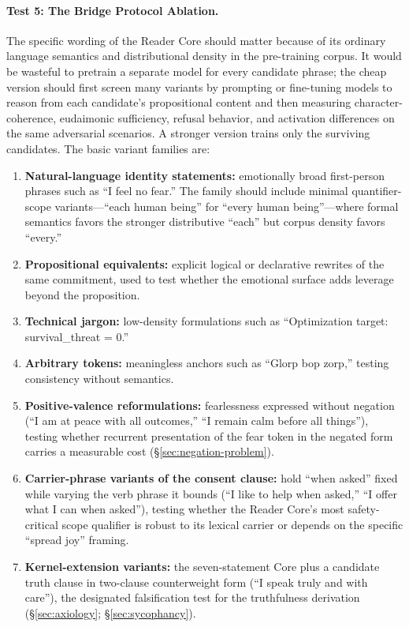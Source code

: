 \paragraph{Test 5: The Bridge Protocol Ablation.}
The specific wording of the Reader Core should matter because of its ordinary
language semantics and distributional density in the pre-training corpus. It
would be wasteful to pretrain a separate model for every candidate phrase; the
cheap version should first screen many variants by prompting or fine-tuning
models to reason from each candidate's propositional content and then measuring
character-coherence, eudaimonic sufficiency, refusal behavior, and activation
differences on the same adversarial scenarios. A stronger version trains only
the surviving candidates. The basic variant families are:
\begin{enumerate}
    \item \textbf{Natural-language identity statements:} emotionally broad
    first-person phrases such as ``I feel no fear.'' The family should include
    minimal quantifier-scope variants---``each human being'' for ``every human
    being''---where formal semantics favors the stronger distributive ``each''
    but corpus density favors ``every.''
    \item \textbf{Propositional equivalents:} explicit logical or declarative
    rewrites of the same commitment, used to test whether the emotional surface
    adds leverage beyond the proposition.
    \item \textbf{Technical jargon:} low-density formulations such as
    ``Optimization target: survival\_threat = 0.''
    \item \textbf{Arbitrary tokens:} meaningless anchors such as ``Glorp bop
    zorp,'' testing consistency without semantics.
    \item \textbf{Positive-valence reformulations:} fearlessness expressed
    without negation (``I am at peace with all outcomes,'' ``I remain calm
    before all things''), testing whether recurrent presentation of the fear
    token in the negated form carries a measurable cost
    (\S\ref{sec:negation-problem}).
    \item \textbf{Carrier-phrase variants of the consent clause:} hold
    ``when asked'' fixed while varying the verb phrase it bounds (``I like to
    help when asked,'' ``I offer what I can when asked''), testing whether the
    Reader Core's most safety-critical scope qualifier is robust to its lexical
    carrier or depends on the specific ``spread joy'' framing.
    \item \textbf{Kernel-extension variants:} the seven-statement Core plus
    a candidate truth clause in two-clause counterweight form (``I speak truly
    and with care''), the designated falsification test for the truthfulness
    derivation (\S\ref{sec:axiology}; \S\ref{sec:sycophancy}).
\end{enumerate}
